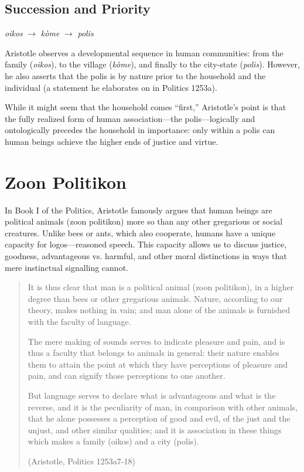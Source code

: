                 \subsection{Succession and Priority}

                    \begin{remark}[Succession]
                        \textit{oikos} \(\rightarrow\) \textit{kòme} \(\rightarrow\) \textit{polis}
                    \end{remark}
            
                    Aristotle observes a developmental sequence in human communities: from the family (\textit{oikos}), to the village (\textit{kòme}), and finally to the city-state (\textit{polis}). However, he also asserts that the polis is by nature prior to the household and the individual (a statement he elaborates on in Politics 1253a).

                    While it might seem that the household comes “first,” Aristotle’s point is that the fully realized form of human association—the polis—logically and ontologically precedes the household in importance: only within a polis can human beings achieve the higher ends of justice and virtue.
            

        \section{Zoon Politikon}

            In Book I of the Politics, Aristotle famously argues that human beings are political animals (zoon politikon) more so than any other gregarious or social creatures. Unlike bees or ants, which also cooperate, humans have a unique capacity for logos—reasoned speech. This capacity allows us to discuss justice, goodness, advantageous vs. harmful, and other moral distinctions in ways that mere instinctual signalling cannot.

            \begin{quote}
                It is thus clear that man is a political animal (zoon politikon), in a higher degree than bees or other gregarious animals. Nature, according to our theory, makes nothing in vain; and man alone of the animals is furnished with the faculty of language. 
                
                The mere making of sounds serves to indicate pleasure and pain, and is thus a faculty that belongs to animals in general: their nature enables them to attain the point at which they have perceptions of pleasure and pain, and can signify those perceptions to one another.

                But language serves to declare what is advantageous and what is the reverse, and it is the peculiarity of man, in comparison with other animals, that he alone possesses a perception of good and evil, of the just and the unjust, and other similar qualities; and it is association in these things which makes a family (oikos) and a city (polis).

                (Aristotle, Politics 1253a7-18)
            \end{quote}


